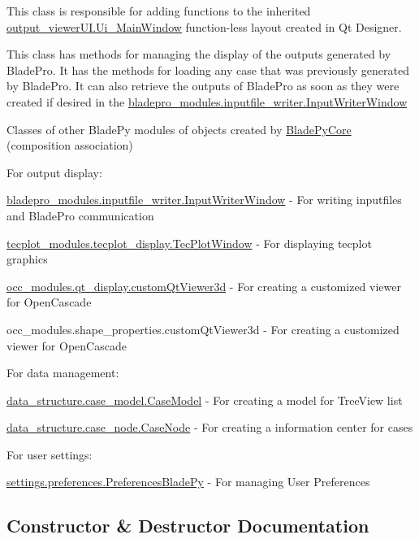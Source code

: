 This class is responsible for adding functions to the inherited \hyperlink{a00098}{output\+\_\+viewer\+U\+I.\+Ui\+\_\+\+Main\+Window} function-\/less layout created in Qt Designer.

This class has methods for managing the display of the outputs generated by Blade\+Pro. It has the methods for loading any case that was previously generated by Blade\+Pro. It can also retrieve the outputs of Blade\+Pro as soon as they were created if desired in the \hyperlink{a00070}{bladepro\+\_\+modules.\+inputfile\+\_\+writer.\+Input\+Writer\+Window}

Classes of other Blade\+Py modules of objects created by \hyperlink{a00078}{Blade\+Py\+Core} (composition association)

For output display\+: \begin{DoxyItemize}
\item {\ttfamily \hyperlink{a00070}{bladepro\+\_\+modules.\+inputfile\+\_\+writer.\+Input\+Writer\+Window}} -\/ For writing inputfiles and Blade\+Pro communication \item {\ttfamily \hyperlink{a00110}{tecplot\+\_\+modules.\+tecplot\+\_\+display.\+Tec\+Plot\+Window}} -\/ For displaying tecplot graphics \item {\ttfamily \hyperlink{a00090}{occ\+\_\+modules.\+qt\+\_\+display.\+custom\+Qt\+Viewer3d}} -\/ For creating a customized viewer for Open\+Cascade \item {\ttfamily occ\+\_\+modules.\+shape\+\_\+properties.\+custom\+Qt\+Viewer3d} -\/ For creating a customized viewer for Open\+Cascade\end{DoxyItemize}
For data management\+: \begin{DoxyItemize}
\item {\ttfamily \hyperlink{a00082}{data\+\_\+structure.\+case\+\_\+model.\+Case\+Model}} -\/ For creating a model for Tree\+View list \item {\ttfamily \hyperlink{a00086}{data\+\_\+structure.\+case\+\_\+node.\+Case\+Node}} -\/ For creating a information center for cases\end{DoxyItemize}
For user settings\+: \begin{DoxyItemize}
\item {\ttfamily \hyperlink{a00102}{settings.\+preferences.\+Preferences\+Blade\+Py}} -\/ For managing User Preferences \end{DoxyItemize}


\subsection{Constructor \& Destructor Documentation}
\hypertarget{a00078_a10b91a0caafffe00be0f4fa9c7a022dc}{}\label{a00078_a10b91a0caafffe00be0f4fa9c7a022dc} 
